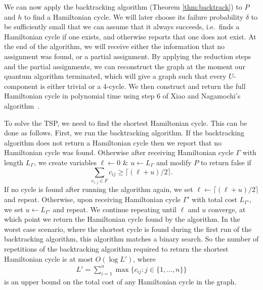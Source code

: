 We can now apply the backtracking algorithm (Theorem \ref{thm:backtrack}) to $P$ and $h$ to find a Hamiltonian cycle. We will later choose its failure probability $\delta$ to be sufficiently small that we can assume that it always succeeds, i.e.\ finds a Hamiltonian cycle if one exists, and otherwise reports that one does not exist. At the end of the algorithm, we will receive either the information that no assignment was found, or a partial assignment. By applying the reduction steps and the partial assignments, we can reconstruct the graph at the moment our quantum algorithm terminated, which will give a graph such that every $U$-component is either trivial or a 4-cycle. We then construct and return the full Hamiltonian cycle in polynomial time using step $6$ of Xiao and Nagamochi's algorithm~\cite{xiao2016degree3}. %

To solve the TSP, we need to find the shortest Hamiltonian cycle. This can be done as follows. First, we run the backtracking algorithm. If the backtracking algorithm does not return a Hamiltonian cycle then we report that no Hamiltonian cycle was found. Otherwise after receiving Hamiltonian cycle $\Gamma$ with length $L_\Gamma$, we create variables $\ell \leftarrow 0$ \& $u \leftarrow L_\Gamma$ and modify $P$ to return false if
%
\[\sum_{e_{i,j}\in F}c_{ij} \geq \lceil(\ell + u)/2\rceil.\]
%
If no cycle is found after running the algorithm again, we set $\ell \leftarrow \lceil(\ell + u)/2\rceil$ and repeat. Otherwise, upon receiving Hamiltonian cycle $\Gamma'$ with total cost $L_{\Gamma'}$, we set $u \leftarrow L_{\Gamma'}$ and repeat. We continue repeating until $\ell$ and $u$ converge, at which point we return the Hamiltonian cycle found by the algorithm. In the worst case scenario, where the shortest cycle is found during the first run of the backtracking algorithm, this algorithm matches a binary search. So the number of repetitions of the backtracking algorithm required to return the shortest Hamiltonian cycle is at most $O(\log L')$, where
%
%
\begin{align}
L' = \sum_{i = 1}^{n}\max \{c_{ij} : j \in \{1,\dots,n\} \}
\label{eqn:l}
\end{align}
%
is an upper bound on the total cost of any Hamiltonian cycle in the graph.

